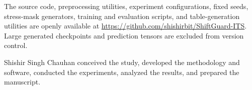 \documentclass[pdflatex,sn-mathphys-num]{sn-jnl}
\begin{document}
The source code, preprocessing utilities, experiment configurations, fixed seeds, stress-mask generators, training and evaluation scripts, and table-generation utilities are openly available at \url{https://github.com/shishirbit/ShiftGuard-ITS}. Large generated checkpoints and prediction tensors are excluded from version control.

Shishir Singh Chauhan conceived the study, developed the methodology and software, conducted the experiments, analyzed the results, and prepared the manuscript.


\end{document}
